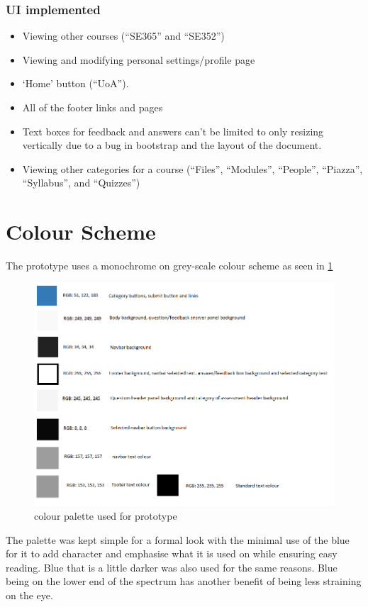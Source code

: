 \documentclass[10pt,a4paper]{article}
\begin{document}
		\subsubsection*{UI implemented}
			\begin{itemize}
				\item Viewing other courses (``SE365'' and ``SE352'')
				\item Viewing and modifying personal settings/profile page
				\item `Home' button (``UoA'').
				\item All of the footer links and pages
				\item Text boxes for feedback and answers can't be limited to only resizing vertically due to a bug in bootstrap and the layout of the document.
				\item Viewing other categories for a course (``Files'', ``Modules'', ``People'', ``Piazza'', ``Syllabus'', and ``Quizzes'')
			\end{itemize}
			
		
\section{Colour Scheme}
	The prototype uses a monochrome on grey-scale colour scheme as seen in \cref{fig:color}
	\begin{figure}[H]
		\centering
		\includegraphics[width=\textwidth]{Colors.PNG}
		\caption{colour palette used for prototype}
		\label{fig:color}
	\end{figure}
	The palette was kept simple for a formal look with the minimal use of the blue for it to add character and emphasise what it is used on while ensuring easy reading. Blue that is a little darker was also used for the same reasons. Blue being on the lower end of the spectrum has another benefit of being less straining on the eye.\\
	
\end{document}
